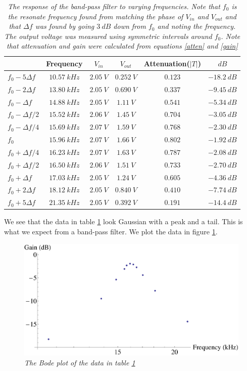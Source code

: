 \documentclass[11pt]{article}
\numberwithin{equation}{section}
\numberwithin{figure}{section}
\numberwithin{table}{section}
\begin{document}
\begin{table}[h]
\centering
\begin{tabular}{lccccc}
		&Frequency	&$V_{in}$	&$V_{out}$	&Attenuation($|T|$)	&$dB$\\
\hline
$f_0-5\Delta f$	&$10.57\ kHz$	&$2.05\ V$	&$0.252\ V$	&$0.123$		&$-18.2\ dB$\\
$f_0-2\Delta f$	&$13.80\ kHz$	&$2.05\ V$	&$0.690\ V$	&$0.337$		&$-9.45\ dB$\\
$f_0-\Delta f$	&$14.88\ kHz$	&$2.05\ V$	&$1.11\ V$	&$0.541$		&$-5.34\ dB$\\
$f_0-\Delta f/2$&$15.52\ kHz$	&$2.06\ V$	&$1.45\ V$	&$0.704$		&$-3.05\ dB$\\
$f_0-\Delta f/4$&$15.69\ kHz$	&$2.07\ V$	&$1.59\ V$	&$0.768$		&$-2.30\ dB$\\
$f_0$		&$15.96\ kHz$	&$2.07\ V$	&$1.66\ V$	&$0.802$		&$-1.92\ dB$\\
$f_0+\Delta f/4$&$16.23\ kHz$	&$2.07\ V$	&$1.63\ V$	&$0.787$		&$-2.08\ dB$\\
$f_0+\Delta f/2$&$16.50\ kHz$	&$2.06\ V$	&$1.51\ V$	&$0.733$		&$-2.70\ dB$\\
$f_0+\Delta f$	&$17.03\ kHz$	&$2.05\ V$	&$1.24\ V$	&$0.605$		&$-4.36\ dB$\\
$f_0+2\Delta f$	&$18.12\ kHz$	&$2.05\ V$	&$0.840\ V$	&$0.410$		&$-7.74\ dB$\\
$f_0+5\Delta f$	&$21.35\ kHz$	&$2.05\ V$	&$0.392\ V$	&$0.191$		&$-14.4\ dB$\\
\end{tabular}
\caption{\textit{The response of the band-pass filter to varying frequencies. Note that $f_0$ is the resonate frequency found from matching the phase of $V_{in}$ and $V_{out}$ and that $\Delta f$ was found by going $3\ dB$ down from $f_0$ and noting the frequency. The output voltage was measured using symmetric intervals around $f_0$. Note that attenuation and gain were calculated from equations \ref{atten} and \ref{gain}}}
\label{BandPass}
\end{table}

We see that the data in table \ref{BandPass} look Gaussian with a peak and a tail. This is what we expect from a band-pass filter. We plot the data in figure \ref{BodePlotBandPass}. 
\begin{figure}[h]
\centering
\includegraphics[scale=0.60]{BodePlotBandPass.eps}
\caption{\textit{The Bode plot of the data in table \ref{BandPass}}}
\label{BodePlotBandPass}
\end{figure}
\end{document}
